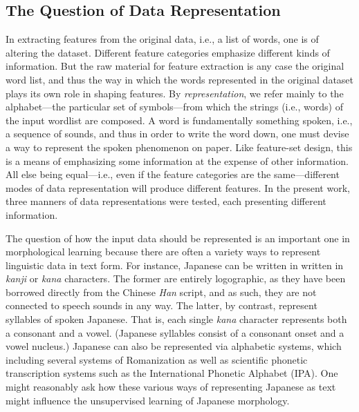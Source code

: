 \begin{definition}
\subsection{The Question of Data Representation} 
In extracting features from the original data, i.e., a list of words, one is of altering the dataset. Different feature categories emphasize different kinds of information. But the raw material for feature extraction is any case the original word list, and thus the way in which the words represented in the original dataset plays its own role in shaping features. 
By \emph{representation}, we refer mainly to the alphabet---the
particular set of symbols---from which the strings (i.e., words) of the input wordlist 
are composed.  A word is fundamentally something spoken, i.e., a sequence of sounds, and thus in order to write the word down, one must devise a way to represent the spoken phenomenon on paper. Like feature-set design, this is a means of emphasizing some information at the expense of other information. All else being equal---i.e., even if the feature categories are the same---different modes of data representation will produce different features.  
In the present work, three manners of data representations were tested, each presenting 
different information. 

The question of how the input data should be represented is an important one in morphological learning because there are often 
a variety ways to represent linguistic data in text form. 
For instance, Japanese can be written in written in \textit{kanji} or 
\textit{kana} characters. The former are entirely logographic, as they 
have been borrowed directly from the Chinese \textit{Han} script, 
and as such, they are not connected to speech sounds in any way. The latter, by contrast,
represent syllables of spoken Japanese. That is, each single \textit{kana} 
character represents both a consonant and a vowel.  (Japanese syllables consist of a consonant onset and a vowel nucleus.)  Japanese can also be represented via alphabetic systems, which including several systems of Romanization as well as scientific phonetic transcription systems such as the International Phonetic Alphabet (IPA).  One might reasonably ask how these various ways of representing Japanese as text might influence the unsupervised learning of Japanese morphology.


\end{definition}
